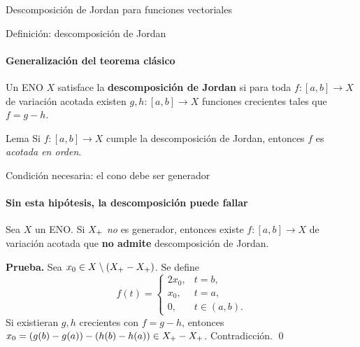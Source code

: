 
\begin{frame}{}
\begin{block}{}
\centering\large
Descomposición de Jordan para funciones vectoriales
\end{block}
\end{frame}


\begin{frame}{Definición: descomposición de Jordan}
\framesubtitle{Generalización del teorema clásico}

\begin{definition}
Un ENO $X$ satisface la \textbf{descomposición de Jordan} si
para toda $f:[a,b]\to X$ de variación acotada existen
$g,h:[a,b]\to X$ funciones crecientes tales que $f=g-h$.
\end{definition}

\medskip

\begin{block}{Lema}
Si $f:[a,b]\to X$ cumple la descomposición de Jordan,
entonces $f$ es \emph{acotada en orden}.
\end{block}


\end{frame}


\begin{frame}{Condición necesaria: el cono debe ser generador}
\framesubtitle{Sin esta hipótesis, la descomposición puede fallar}

\begin{theorem}
Sea $X$ un ENO. Si $X_{+}$ \emph{no} es generador, entonces existe
$f:[a,b]\to X$ de variación acotada que \textbf{no admite}
descomposición de Jordan.
\end{theorem}

\medskip
\textbf{Prueba.} Sea $x_0\in X\setminus(X_{+}-X_{+})$. Se define
\[
f(t)=\begin{cases}
  2x_0, & t=b,\\
  x_0,  & t=a,\\
  0,    & t\in(a,b).
\end{cases}
\]
Si existieran $g,h$ crecientes con $f=g-h$, entonces
$x_0 = (g(b)-g(a))-(h(b)-h(a)) \in X_{+}-X_{+}$. Contradicción. \qed

\end{frame}

